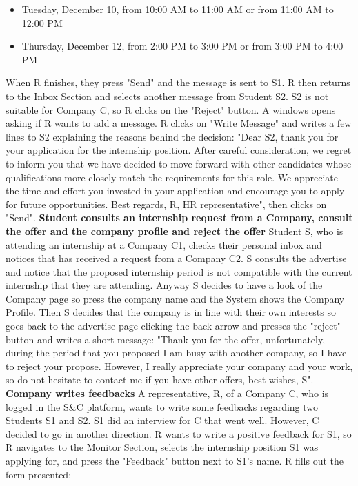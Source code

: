 \begin{itemize}
    \item Tuesday, December 10, from 10:00 AM to 11:00 AM or from 11:00 AM to 12:00 PM
    \item Thursday, December 12, from 2:00 PM to 3:00 PM or from 3:00 PM to 4:00 PM
\end{itemize}
When R finishes, they press "Send" and the message is sent to S1. 
R then returns to the Inbox Section and selects another message from Student S2. S2 is not suitable for Company C, so R clicks on the "Reject" button. A windows opens asking if R wants to add a message. R clicks on "Write Message" and writes a few lines to S2 explaining the reasons behind the decision: "Dear S2, thank you for your application for the internship position. After careful consideration, we regret to inform you that we have decided to move forward with other candidates whose qualifications more closely match the requirements for this role. We appreciate the time and effort you invested in your application and encourage you to apply for future opportunities.
Best regards,
R, HR representative", then clicks on "Send".
\newline\newline
\textbf{Student consults an internship request from a Company, consult the offer and the company profile and reject the offer}
\newline
Student S, who is attending an internship at a Company C1, checks their personal inbox and notices that has received a request from a Company C2. S consults the advertise and notice that the proposed internship period is not compatible with the current internship that they are attending. Anyway S decides to have a look of the Company page so press the company name and the System shows the Company Profile. Then S decides that the company is in line with their own interests so goes back to the advertise page clicking the back arrow and presses the "reject" button and writes a short message: "Thank you for the offer, unfortunately, during the period that you proposed I am busy with another company, so I have to reject your propose. However, I really appreciate your company and your work, so do not hesitate to contact me if you have other offers, best wishes, S".
\textbf{Company writes feedbacks}
\newline
A representative, R, of a Company C, who is logged in the S\&C platform, wants to write some feedbacks regarding two Students S1 and S2. S1 did an interview for C that went well. However, C decided to go in another direction. R wants to write a positive feedback for S1, so R navigates to the Monitor Section, selects the internship position S1 was applying for, and press the "Feedback" button next to S1's name. R fills out the form presented:
